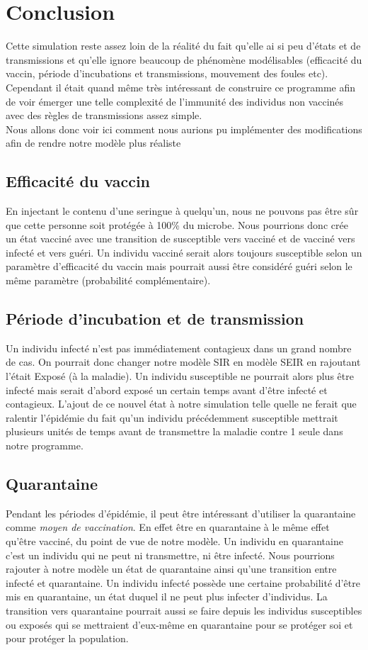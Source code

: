 \documentclass[journal, a4paper]{IEEEtran}
\begin{document}
\section{Conclusion}
Cette simulation reste assez loin de la réalité du fait qu'elle ai si peu d'états et de transmissions et qu'elle ignore beaucoup de phénomène modélisables (efficacité du vaccin, période d'incubations et transmissions, mouvement des foules etc). Cependant il était quand même très intéressant de construire ce programme afin de voir émerger une telle complexité de l'immunité des individus non vaccinés avec des règles de transmissions assez simple.\\
Nous allons donc voir ici comment nous aurions pu implémenter des modifications afin de rendre notre modèle plus réaliste
\subsection{Efficacité du vaccin}
En injectant le contenu d'une seringue à quelqu'un, nous ne pouvons pas être sûr que cette personne soit protégée à 100\% du microbe. Nous pourrions donc crée un état vacciné avec une transition de susceptible vers vacciné et de vacciné vers infecté et vers guéri. Un individu vacciné serait alors toujours susceptible selon un paramètre d'efficacité du vaccin mais pourrait aussi être considéré guéri selon le même paramètre (probabilité complémentaire).
\subsection{Période d'incubation et de transmission}
Un individu infecté n'est pas immédiatement contagieux dans un grand nombre de cas. On pourrait donc changer notre modèle SIR en modèle SEIR en rajoutant l'était Exposé (à la maladie). Un individu susceptible ne pourrait alors plus être infecté mais serait d'abord exposé un certain temps avant d'être infecté et contagieux. L'ajout de ce nouvel état à notre simulation telle quelle ne ferait que ralentir l'épidémie du fait qu'un individu précédemment susceptible mettrait plusieurs unités de temps avant de transmettre la maladie contre 1 seule dans notre programme.
\subsection{Quarantaine}
Pendant les périodes d'épidémie, il peut être intéressant d'utiliser la quarantaine comme \textit{moyen de vaccination}. En effet être en quarantaine à le même effet qu'être vacciné, du point de vue de notre modèle. Un individu en quarantaine c'est un individu qui ne peut ni transmettre, ni être infecté.
Nous pourrions rajouter à notre modèle un état de quarantaine ainsi qu'une transition entre infecté et quarantaine. Un individu infecté possède une certaine probabilité d'être mis en quarantaine, un état duquel il ne peut plus infecter d'individus. La transition vers quarantaine pourrait aussi se faire depuis les individus susceptibles ou exposés qui se mettraient d'eux-même en quarantaine pour se protéger soi et pour protéger la population.






\newpage

\end{document}
